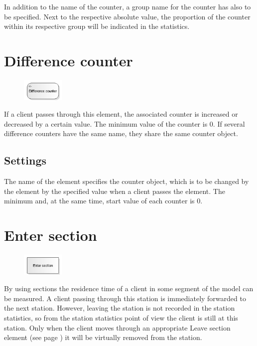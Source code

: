 In addition to the name of the counter, a group name for the counter has also to be specified.
Next to the respective absolute value, the proportion of the counter within its respective group
will be indicated in the statistics.


\section{Difference counter}
\label{ref:ModelElementDifferentialCounter}

\begin{figure}
\vspace{-22pt}
\includegraphics[width=2cm]{imageModelElementDifferentialCounter.png}
\vspace{-22pt}
\end{figure}

If a client passes through this element, the associated counter is increased or decreased by a certain value.
The minimum value of the counter is 0. If several difference counters have the same name, they share the same
counter object.

\subsection*{Settings}

The name of the element specifies the counter object, which is to be changed by the element by the specified value
when a client passes the element. The minimum and, at the same time, start value of each counter is 0.


\section{Enter section}
\label{ref:ModelElementSectionStart}

\begin{figure}
\vspace{-22pt}
\includegraphics[width=2cm]{imageModelElementSectionStart.png}
\vspace{-22pt}
\end{figure}

By using sections the residence time of a client in some segment of the model can be measured.
A client passing through this station is immediately forwarded to the next station.
However, leaving the station is not recorded in the station statistics, so from the station
statistics point of view the client is still at this station. Only when the client moves through
an appropriate Leave section element (see page \pageref{ref:ModelElementSectionEnd}) it will be
virtually removed from the station.

